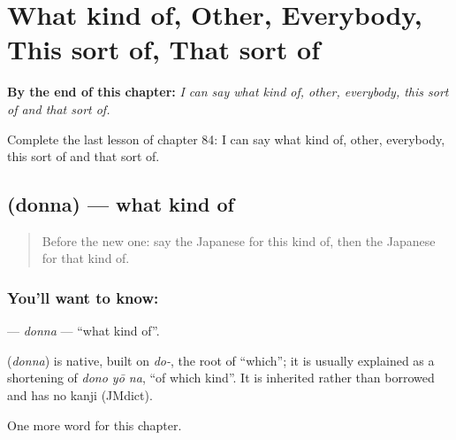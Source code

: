 
\chapter{What kind of, Other, Everybody, This sort of, That sort of}
\label{ch:ja-what-kind-of-other-everybody-this-sort-of-that-sort-of}

\begin{chapteropening}
\textbf{By the end of this chapter:} \emph{I can say what kind of, other, everybody, this sort of and that sort of.}

Complete the last lesson of chapter 84: I can say what kind of, other, everybody, this sort of and that sort of.
\end{chapteropening}

\section[\texorpdfstring{\ja{どんな} (donna)}{どんな (donna)}]{ (donna) — what kind of}

\label{lesson:JA-C84-donna}



\begin{quote}
Before the new one: say the Japanese for this kind of, then the Japanese for that kind of.
\end{quote}

\subsection*{You'll want to know: }
\textbf{} — \emph{donna} — \textquotedblleft{}what kind of\textquotedblright{}.

\begin{cousinweb}
\textbf{} (\emph{donna}) is native, built on \emph{do-}, the root of \textquotedblleft{}which\textquotedblright{}; it is usually explained as a shortening of \emph{dono yō na}, \textquotedblleft{}of which kind\textquotedblright{}. It is inherited rather than borrowed and has no kanji (JMdict).
\end{cousinweb}

\begin{grammarlens}[title={What you've built}]
One more word for this chapter.
\end{grammarlens}

